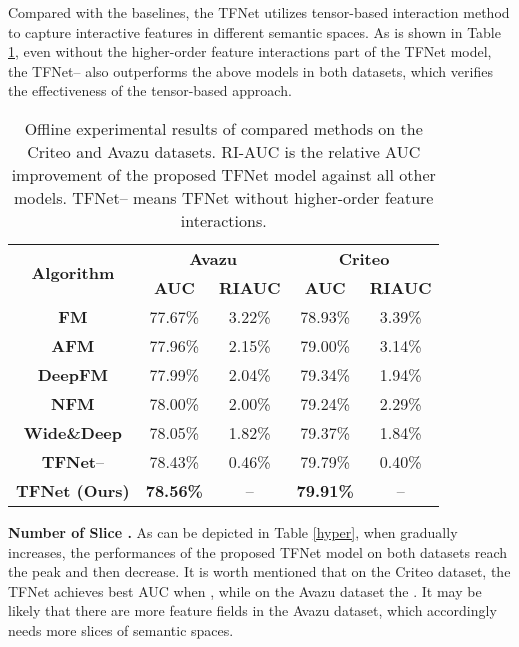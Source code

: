 \documentclass[sigconf]{acmart}
\begin{document}
Compared with the baselines, the TFNet utilizes tensor-based interaction method to capture interactive features in different semantic spaces. As is shown in Table \ref{compare}, even without the higher-order feature interactions part of the TFNet model, the TFNet-- also outperforms the above models in both datasets, which verifies the effectiveness of the tensor-based approach.

\begin{table}[t]
\setlength{\abovecaptionskip}{0pt}  \setlength{\belowcaptionskip}{0pt}  \small
\centering
  \caption{Offline experimental results of compared methods on the Criteo and Avazu datasets. RI-AUC is the relative AUC improvement of the proposed TFNet model against all other models. {TFNet}-- means TFNet without higher-order feature interactions.}
\begin{tabular}{|c|c|c|c|c|}
\hline
\multirow{2}{*}{\textbf{Algorithm}} & \multicolumn{2}{c|}{\textbf{Avazu}} & \multicolumn{2}{c|}{\textbf{Criteo}} \\ \cline{2-5} 
                           & \textbf{AUC}        & \textbf{RI\text{-}AUC}   & \textbf{AUC}        & \textbf{RI\text{-}AUC}    \\ \hline
\textbf{FM}                & 77.67\%             & 3.22\%        & 78.93\%             & 3.39\%         \\ \hline
\textbf{AFM}               & 77.96\%             & 2.15\%        & 79.00\%             & 3.14\%         \\ \hline
\textbf{DeepFM}            & 77.99\%             & 2.04\%        & 79.34\%             & 1.94\%         \\ \hline
\textbf{NFM}               & 78.00\%             & 2.00\%        & 79.24\%             & 2.29\%         \\ \hline

\textbf{Wide\&Deep}        & 78.05\%             & 1.82\%        & 79.37\%             & 1.84\%         \\ \hline
\textbf{TFNet}--               & {78.43\%}    & {0.46\%}     & {79.79\%}    & {0.40\%}      \\ \hline
\textbf{TFNet (Ours)}               & \textbf{78.56\%}    & {--}     & \textbf{79.91\%}    & {--}      \\ \hline
\end{tabular}
\label{compare}
\end{table}



\noindent\textbf{Number of Slice .}
As can be depicted in Table \ref{hyper}, when  gradually increases, the performances of the proposed TFNet model on both datasets reach the peak and then decrease. It is worth mentioned that on the Criteo dataset, the TFNet achieves best AUC when , while on the Avazu dataset the . It may be likely that there are more feature fields in the Avazu dataset, which accordingly needs more slices of semantic spaces.
\end{document}
